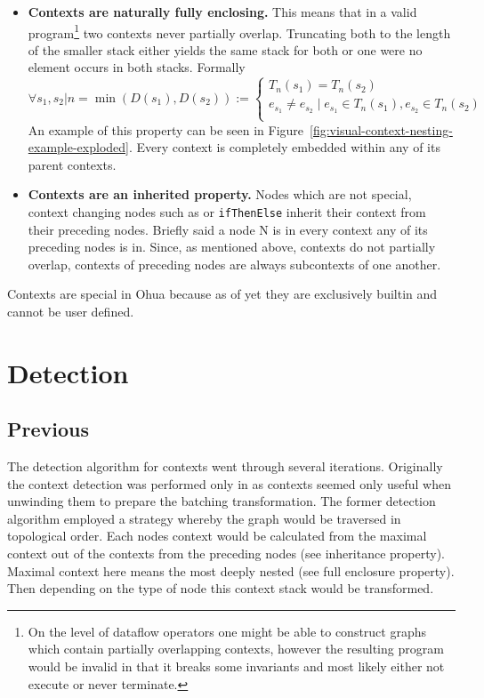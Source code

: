 \begin{itemize}
  \item \textbf{Contexts are naturally fully enclosing.}
        This means that in a valid program\footnote{On the level of dataflow operators one might be able to construct graphs which contain partially overlapping contexts, however the resulting program would be invalid in that it breaks some invariants and most likely either not execute or never terminate.} two contexts never partially overlap.
        Truncating both to the length of the smaller stack either yields the same stack for both or one were no element occurs in both stacks.
        Formally
        \[
        \forall s_1, s_2 | n = \min(D(s_1), D(s_2)) :=
          \begin{cases}
            T_n(s_1) = T_n(s_2) \\
            e_{s_1} \neq e_{s_2} \mid e_{s_1} \in T_n(s_1), e_{s_2} \in T_n(s_2) \\
          \end{cases}
        \]
        An example of this property can be seen in Figure~\ref{fig:visual-context-nesting-example-exploded}.
        Every context is completely embedded within any of its parent contexts.

  \item \textbf{Contexts are an inherited property.}
        Nodes which are not special, context changing nodes such as \smap{} or \texttt{ifThenElse} inherit their context from their preceding nodes.
        Briefly said a node N is in every context any of its preceding nodes is in.
        Since, as mentioned above, contexts do not partially overlap, contexts of preceding nodes are always subcontexts of one another.
\end{itemize}

Contexts are special in Ohua because as of yet they are exclusively builtin and cannot be user defined.

\section{Detection}

\subsection{Previous}

The detection algorithm for contexts went through several iterations.
Originally the context detection was performed only in \yauhau{} as contexts seemed only useful when unwinding them to prepare the batching transformation.
The former detection algorithm employed a strategy whereby the graph would be traversed in topological order.
Each nodes context would be calculated from the maximal context out of the contexts from the preceding nodes (see inheritance property).
Maximal context here means the most deeply nested (see full enclosure property).
Then depending on the type of node this context stack would be transformed.

